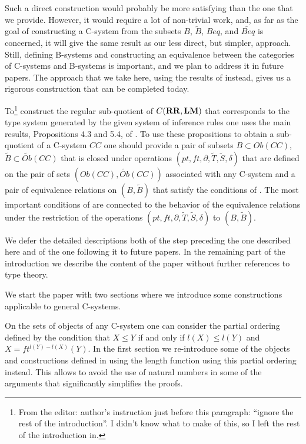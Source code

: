 \documentclass[12pt]{amsart}
\newcommand{\wt}{\widetilde}
\newcommand{\RR}{{\bf RR}}
\newcommand{\LM}{{\bf LM}}
\begin{document}
Such a direct construction would probably be more satisfying than the one that
we provide. However, it would require a lot of non-trivial work, and, as far as
the goal of constructing a C-system from the subsets $B$, $\wt{B}$, $Beq$, and
$\wt{Beq}$ is concerned, it will give the same result as our less direct, but simpler,
approach. Still, defining B-systems and constructing an equivalence between the
categories of C-systems and B-systems is important, and we plan to address it in
future papers. The approach that we take here, using the results of
\cite{Csubsystems} instead, gives us a rigorous construction that can be
completed today.

To\footnote{From the editor: author's instruction just before this paragraph:
  ``ignore the rest of the introduction''.  I didn't know what to make of this,
  so I left the rest of the introduction in.}
construct the regular sub-quotient of $C(\RR,\LM)$ that corresponds to the
type system generated by the given system of inference rules one uses the main
results, Propositions 4.3 and 5.4, of \cite{Csubsystems}. To use these
propositions to obtain a sub-quotient of a C-system $CC$ one should provide a
pair of subsets $B\subset Ob(CC)$, $\wt{B}\subset \wt{Ob}(CC)$ that is closed
under operations $(pt,ft,\partial,\wt{T},\wt{S},\delta)$ that are defined on
the pair of sets $(Ob(CC),\wt{Ob}(CC))$ associated with any C-system
\cite[Prop. 4.3]{Csubsystems} and a pair of equivalence relations on
$(B,\wt{B})$ that satisfy the conditions of \cite[Prop. 5.4]{Csubsystems}. The
most important conditions of \cite[Prop. 5.4]{Csubsystems} are connected to the
behavior of the equivalence relations under the restriction of the operations
$(pt,ft,\partial,\wt{T},\wt{S},\delta)$ to $(B,\wt{B})$.

We defer the detailed descriptions both of the step preceding the one described
here and of the one following it to future papers. In the remaining part of the
introduction we describe the content of the paper without further references to
type theory.

We start the paper with two sections where we introduce some constructions
applicable to general C-systems.

On the sets of objects of any C-system one can consider the partial ordering
defined by the condition that $X\le Y$ if and only if $l(X)\le l(Y)$ and
$X=ft^{l(Y)-l(X)}(Y)$. In the first section we re-introduce some of the objects
and constructions defined in \cite{Csubsystems} using the length function using
this partial ordering instead. This allows to avoid the use of natural numbers
in some of the arguments that significantly simplifies the proofs.
\end{document}
